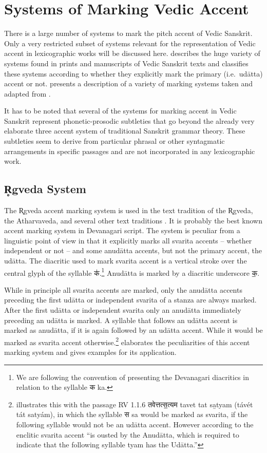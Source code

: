 \chapter{Systems of Marking Vedic Accent}

There is a large number of systems to mark the pitch accent of Vedic Sanskrit. Only a very restricted subset of systems relevant for the representation of  Vedic accent in lexicographic works will be discussed here. \citet{Witzel1974} describes the huge variety of systems found in prints and manuscripts of Vedic Sanskrit texts and classifies these systems according to whether they explicitly mark the primary (i.e.~udātta) accent or not. \citet{Scharf2007} presents a description of a variety of marking systems taken and adapted from \citet{MYV1964}.

It has to be noted that several of the systems for marking accent in Vedic Sanskrit represent phonetic-prosodic subtleties that go beyond the already very elaborate three accent system of traditional Sanskrit grammar theory. These subtleties seem to derive from particular phrasal or other syntagmatic arrangements in specific passages and are not incorporated in any lexicographic work.

\section{R̥gveda System}

The R̥gveda accent marking system is used in the text tradition of the R̥gveda, the Atharvaveda, and several other text traditions \citep[see][for more information]{Scharf2007}. It is probably the best known accent marking system in Devanagari script. The system is peculiar from a linguistic point of view in that it explicitly marks all svarita accents – whether independent or not – and some anudātta accents, but not the primary accent, the udātta. The diacritic used to mark svarita accent is a vertical stroke over the central glyph of the syllable  {\devfont क॑}.\footnote{We are following the convention of presenting the Devanagari diacritics in relation to the syllable {\devfont क} ka.} Anudātta is marked by a diacritic underscore {\devfont क॒}.

While in principle all svarita accents are marked, only the anudātta accents preceding the first udātta or independent svarita of a stanza are always marked. After the first udātta or independent svarita only an anudātta immediately preceding an udātta is marked. A syllable that follows an udātta accent is marked as anudātta, if it is again followed by an udātta accent. While it would be marked as svarita accent otherwise.\footnote{\citet[p.~449]{Macdonell1916} illustrates this with the passage RV 1.1.6 {\devfont तवेत्तत्स॒त्यम} tavet tat sa̲tyam (távét tát satyám), in which the syllable {\devfont स} sa would be marked as svarita, if the following syllable would not be an udātta accent. However according to \citet[p.~449]{Macdonell1916} the enclitic svarita accent “is ousted by the Anudātta, which is required to indicate that the following syllable tyam has the Udātta.”}  \citet[p.~449]{Macdonell1916} elaborates the peculiarities of this accent marking system and gives examples for its application.

